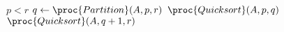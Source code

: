 \begin{codebox}
\li \If $p < r$
\li 	\Then
			$q \gets \proc{Partition}(A,p,r)$
\li 		$\proc{Quicksort}(A,p,q)$
\li 		$\proc{Quicksort}(A,q+1,r)$
		\End
\end{codebox}